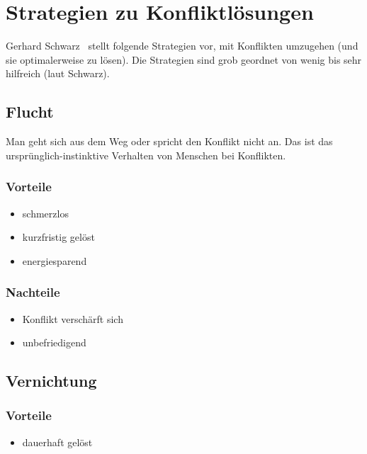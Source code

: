\section{Strategien zu Konfliktlösungen}
\label{konfliktloesungs-strategien}

Gerhard Schwarz~\cite{schwarz-konfliktmanagement} stellt folgende Strategien vor, mit Konflikten umzugehen (und sie optimalerweise zu lösen). Die Strategien sind grob geordnet von \glqq wenig bis sehr hilfreich\grqq{} (laut Schwarz).

\subsection{Flucht}

Man geht sich aus dem Weg oder spricht den Konflikt nicht an. Das ist das ursprünglich-instinktive Verhalten von Menschen bei Konflikten.

\subsubsection{Vorteile}
\begin{itemize}
    \item schmerzlos
    \item kurzfristig gelöst
    \item energiesparend
\end{itemize}

\subsubsection{Nachteile}
\begin{itemize}
    \item Konflikt verschärft sich
    \item unbefriedigend
\end{itemize}

\subsection{Vernichtung}

\subsubsection{Vorteile}
\begin{itemize}
    \item dauerhaft gelöst
\end{itemize}


